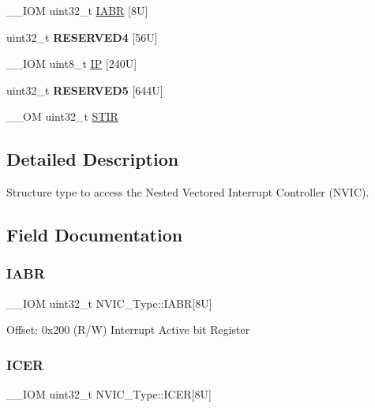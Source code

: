\begin{DoxyCompactItemize}
\+\_\+\+\_\+\+I\+OM uint32\+\_\+t \mbox{\hyperlink{structNVIC__Type_a55efb38ee86027a5e0b92bd40dba46c4}{I\+A\+BR}} \mbox{[}8\+U\mbox{]}
\item 
\mbox{\label{structNVIC__Type_ade202178a4bd7c973b7db69d30046f50}} 
uint32\+\_\+t {\bfseries R\+E\+S\+E\+R\+V\+E\+D4} \mbox{[}56\+U\mbox{]}
\item 
\+\_\+\+\_\+\+I\+OM uint8\+\_\+t \mbox{\hyperlink{structNVIC__Type_a9a4341692e45d089a113986a3d344e98}{IP}} \mbox{[}240\+U\mbox{]}
\item 
\mbox{\label{structNVIC__Type_ab105e118183b4a205c3c1dddcea70d62}} 
uint32\+\_\+t {\bfseries R\+E\+S\+E\+R\+V\+E\+D5} \mbox{[}644\+U\mbox{]}
\item 
\+\_\+\+\_\+\+OM uint32\+\_\+t \mbox{\hyperlink{structNVIC__Type_a37de89637466e007171c6b135299bc75}{S\+T\+IR}}
\end{DoxyCompactItemize}


\subsection{Detailed Description}
Structure type to access the Nested Vectored Interrupt Controller (N\+V\+IC). 

\subsection{Field Documentation}
\mbox{\label{structNVIC__Type_a55efb38ee86027a5e0b92bd40dba46c4}} 
\subsubsection{\texorpdfstring{IABR}{IABR}}
{\footnotesize\ttfamily \+\_\+\+\_\+\+I\+OM uint32\+\_\+t N\+V\+I\+C\+\_\+\+Type\+::\+I\+A\+BR\mbox{[}8\+U\mbox{]}}

Offset\+: 0x200 (R/W) Interrupt Active bit Register \mbox{\label{structNVIC__Type_ad30ec76aa0be02aa9a56ff4bdc401180}} 
\subsubsection{\texorpdfstring{ICER}{ICER}}
{\footnotesize\ttfamily \+\_\+\+\_\+\+I\+OM uint32\+\_\+t N\+V\+I\+C\+\_\+\+Type\+::\+I\+C\+ER\mbox{[}8\+U\mbox{]}}

